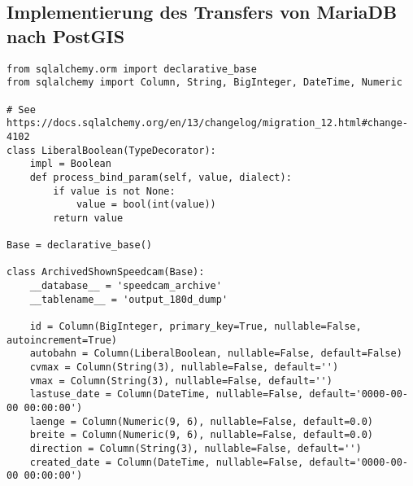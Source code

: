 \subsection{Implementierung des Transfers von MariaDB nach PostGIS}
\label{sec:ToPostGIS}

\begin{code}
\begin{verbatim}
from sqlalchemy.orm import declarative_base
from sqlalchemy import Column, String, BigInteger, DateTime, Numeric

# See https://docs.sqlalchemy.org/en/13/changelog/migration_12.html#change-4102
class LiberalBoolean(TypeDecorator):
    impl = Boolean
    def process_bind_param(self, value, dialect):
        if value is not None:
            value = bool(int(value))
        return value

Base = declarative_base()

class ArchivedShownSpeedcam(Base):
    __database__ = 'speedcam_archive'
    __tablename__ = 'output_180d_dump'

    id = Column(BigInteger, primary_key=True, nullable=False, autoincrement=True)
    autobahn = Column(LiberalBoolean, nullable=False, default=False)
    cvmax = Column(String(3), nullable=False, default='')
    vmax = Column(String(3), nullable=False, default='')
    lastuse_date = Column(DateTime, nullable=False, default='0000-00-00 00:00:00')
    laenge = Column(Numeric(9, 6), nullable=False, default=0.0)
    breite = Column(Numeric(9, 6), nullable=False, default=0.0)
    direction = Column(String(3), nullable=False, default='')
    created_date = Column(DateTime, nullable=False, default='0000-00-00 00:00:00')
\end{verbatim}
\label{lst:SQLAlchemyModelMariaDB}
\end{code}

\clearpage

